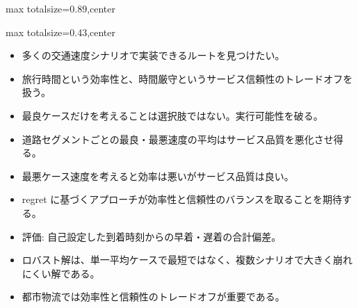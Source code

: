 \begin{minipage}[t]{0.58\textwidth}
\begin{adjustbox}{max totalsize={\textwidth}{0.89\textheight},center}
\begin{minipage}{\textwidth}
\end{minipage}
\end{adjustbox}
\end{minipage}


\clearpage
{}
\begin{minipage}[t]{0.405\textwidth}
\begin{adjustbox}{max totalsize={\textwidth}{0.43\textheight},center}
\begin{minipage}{\textwidth}\scriptsize
{}\begin{itemize}
\item 多くの交通速度シナリオで実装できるルートを見つけたい。
\item 旅行時間という効率性と、時間厳守というサービス信頼性のトレードオフを扱う。
\item 最良ケースだけを考えることは選択肢ではない。実行可能性を破る。
\item 道路セグメントごとの最良・最悪速度の平均はサービス品質を悪化させ得る。
\item 最悪ケース速度を考えると効率は悪いがサービス品質は良い。
\item regret に基づくアプローチが効率性と信頼性のバランスを取ることを期待する。
\item 評価: 自己設定した到着時刻からの早着・遅着の合計偏差。
\end{itemize}\begin{itemize}
\item ロバスト解は、単一平均ケースで最短ではなく、複数シナリオで大きく崩れにくい解である。
\item 都市物流では効率性と信頼性のトレードオフが重要である。
\end{itemize}
\end{minipage}
\end{adjustbox}
\end{minipage}\hfill
